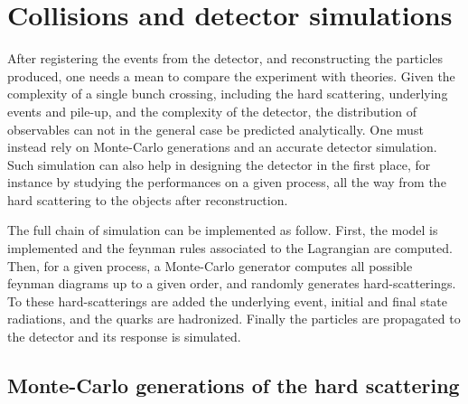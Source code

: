         \section{Collisions and detector simulations}

            After registering the events from the detector, and reconstructing the particles
            produced, one needs a mean to compare the experiment with theories. Given
            the complexity of a single bunch crossing, including the hard scattering,
            underlying events and pile-up, and the complexity of the detector, the distribution
            of observables can not in the general case be predicted analytically. One must
            instead rely on Monte-Carlo generations and an accurate detector simulation.
            Such simulation can also help in designing the detector in the first place, for
            instance by studying the performances on a given process, all the way
            from the hard scattering to the objects after reconstruction.

            The full chain of simulation can be implemented as follow. First, the model
            is implemented and the feynman rules associated to the Lagrangian are computed.
            Then, for a given process, a Monte-Carlo generator computes all possible
            feynman diagrams up to a given order, and randomly generates hard-scatterings.
            To these hard-scatterings are added the underlying event, initial and
            final state radiations, and the quarks are hadronized. Finally the particles
            are propagated to the detector and its response is simulated.

            \subsection{Monte-Carlo generations of the hard scattering}


